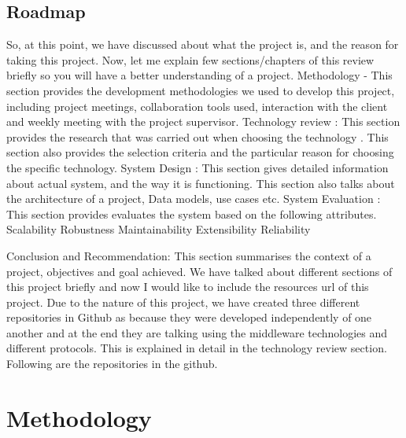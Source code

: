 	\section {Roadmap}
	So, at this point, we have discussed about what the project is, and the reason for taking this project. Now, let me explain few sections/chapters of this review briefly so you will have a better understanding of a project.
	Methodology  - This section provides the development methodologies we used to develop this project, including project meetings, collaboration tools used, interaction with the client and weekly meeting with the project supervisor. 
	Technology review : This section provides the research that was carried out when choosing the technology . This section also provides the selection criteria and the particular reason for choosing the specific technology.
	System Design : This section gives detailed information about actual system, and the way it is functioning. This section also talks about the architecture of a project, Data models, use cases etc.  
	System Evaluation : This section provides evaluates the system based on the following attributes.
	Scalability
	Robustness
	Maintainability
	Extensibility 
	Reliability 
	
	Conclusion and Recommendation: This section summarises the context of a project, objectives and goal achieved. 
	We have talked about different sections of this project briefly and now I would like  to include the resources url of this project.  Due to the nature of this project, we have created three different repositories in Github as because they were developed independently of one another and at the end they are talking using the middleware technologies and different protocols. This is explained in detail in the technology review section.  Following are the repositories in the github.
	

\chapter{Methodology}

